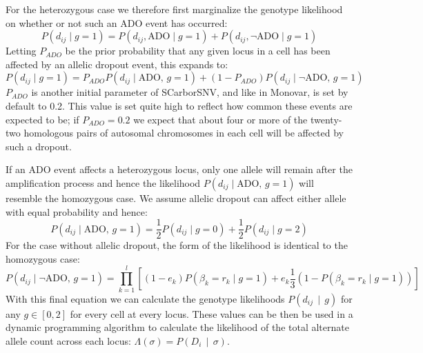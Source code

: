 \documentclass[../../main.tex]{subfiles}
\begin{document}
For the heterozygous case we therefore first marginalize the genotype likelihood on whether or not such an ADO event has occurred:
\begin{equation*}
    P(d_{ij}\mid g=1) = P(d_{ij}, \text{ADO} \mid g=1)+ P(d_{ij}, \neg \text{ADO}\mid g=1)
\end{equation*}
Letting $P_{ADO}$ be the prior probability that any given locus in a cell has been affected by an allelic dropout event, this expands to:
\begin{equation*}
    P(d_{ij}\mid g=1) = P_{ADO}P(d_{ij}\mid \text{ADO},\, g=1) + (1-P_{ADO})P(d_{ij} \mid \neg \text{ADO},\, g=1)
\end{equation*}
$P_{ADO}$ is another initial parameter of SCarborSNV, and like in Monovar, is set by default to 0.2.
This value is set quite high to reflect how common these events are expected to be; if $P_{ADO}=0.2$ we expect that about four or more of the twenty-two homologous pairs of autosomal chromosomes in each cell will be affected by such a dropout.

If an ADO event affects a heterozygous locus, only one allele will remain after the amplification process and hence the likelihood $P(d_{ij}\mid \text{ADO},\, g=1)$ will resemble the homozygous case.
We assume allelic dropout can affect either  allele with equal probability and hence:
\begin{equation*}
    P(d_{ij}\mid \text{ADO},\, g=1) =\frac{1}{2}P(d_{ij}\mid g=0) + \frac{1}{2}P(d_{ij}\mid g=2)
\end{equation*}
For the case without allelic dropout, the form of the likelihood is identical to the homozygous case:
\begin{equation*}
      P(d_{ij}\mid \neg\text{ADO},\,g=1) = \prod_{k=1}^l \left[ (1-e_k)P(\beta_k=r_k\mid g=1) + e_k \frac{1}{3} (1-P(\beta_k=r_k\mid g=1)) \right]
\end{equation*}
With this final equation we can calculate the genotype likelihoods $P(d_{ij}\,\mid\,g)$ for any $g\in[0,2]$ for every cell at every locus.
These values can be then be used in a dynamic programming algorithm to calculate the likelihood of the total alternate allele count across each locus: $\Lambda(\sigma) = P(D_{i}\,\mid\,\sigma)$.
\end{document}
